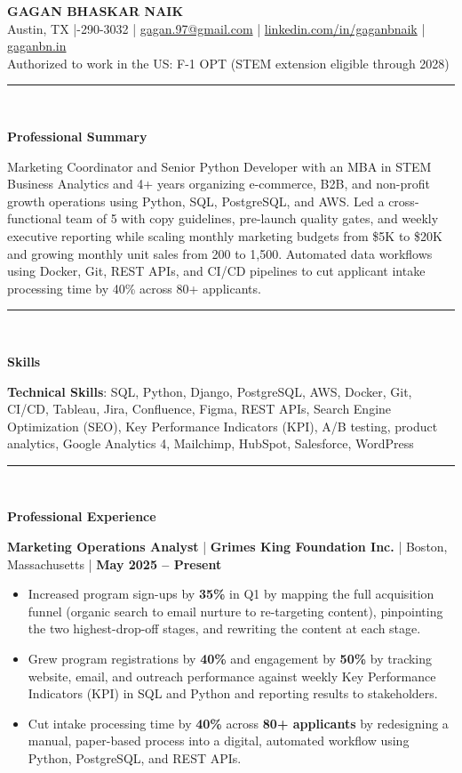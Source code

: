 \documentclass[11pt,letterpaper]{article}
\newcommand{\sectiontitle}[1]{%
  \vspace{3pt}
  \rule{\linewidth}{1.0pt}\\[-12pt]
  \begin{center}
    {\large \textbf{#1}}\\[-5pt]
  \end{center}
  \vspace{-3pt}
}
\newcommand{\job}[4]{%
  \textbf{#1} \;|\; \textbf{#2} \;|\; #3 \;|\; \textbf{#4}\par%
  \vspace{1pt}%
}
\begin{document}
\begin{center}
{\large \textbf{GAGAN BHASKAR NAIK}}\\[2pt]
Austin, TX \;|-290-3032 \;|\;
\href{mailto:gagan.97@gmail.com}{gagan.97@gmail.com} \;|\;
\href{https://www.linkedin.com/in/gaganbnaik}{linkedin.com/in/gaganbnaik} \;|\;
\href{https://gaganbn.in}{gaganbn.in}\\
Authorized to work in the US: F-1 OPT (STEM extension eligible through 2028)
\end{center}
\vspace{-4pt}

\sectiontitle{Professional Summary}
Marketing Coordinator and Senior Python Developer with an MBA in STEM Business Analytics and 4+ years organizing e-commerce, B2B, and non-profit growth operations using Python, SQL, PostgreSQL, and AWS. Led a cross-functional team of 5 with copy guidelines, pre-launch quality gates, and weekly executive reporting while scaling monthly marketing budgets from \$5K to \$20K and growing monthly unit sales from 200 to 1,500. Automated data workflows using Docker, Git, REST APIs, and CI/CD pipelines to cut applicant intake processing time by 40\% across 80+ applicants.

\sectiontitle{Skills}
\textbf{Technical Skills}: SQL, Python, Django, PostgreSQL, AWS, Docker, Git, CI/CD, Tableau, Jira, Confluence, Figma, REST APIs, Search Engine Optimization (SEO), Key Performance Indicators (KPI), A/B testing, product analytics, Google Analytics 4, Mailchimp, HubSpot, Salesforce, WordPress

\sectiontitle{Professional Experience}

\job{Marketing Operations Analyst}
{Grimes King Foundation Inc.}
{Boston, Massachusetts}
{May 2025 -- Present}
\begin{itemize}
  \item Increased program sign-ups by \textbf{35\%} in Q1 by mapping the full acquisition funnel (organic search to email nurture to re-targeting content), pinpointing the two highest-drop-off stages, and rewriting the content at each stage.
  \item Grew program registrations by \textbf{40\%} and engagement by \textbf{50\%} by tracking website, email, and outreach performance against weekly Key Performance Indicators (KPI) in SQL and Python and reporting results to stakeholders.
  \item Cut intake processing time by \textbf{40\%} across \textbf{80+ applicants} by redesigning a manual, paper-based process into a digital, automated workflow using Python, PostgreSQL, and REST APIs.
\end{itemize}
\end{document}
